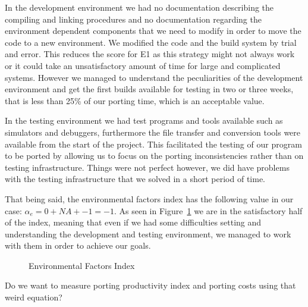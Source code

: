 In the development environment we had no documentation describing the compiling
and linking procedures and no documentation regarding the environment dependent
components that we need to modify in order to move the code to a new
environment. We modified the code and the build system by trial and error. This
reduces the score for E1 as this strategy might not always work or it could take
an unsatisfactory amount of time for large and complicated systems. However
we managed to understand the peculiarities of the development environment and
get the first builds available for testing in two or three weeks, that is less
than 25\% of our porting time, which is an acceptable value.

In the testing environment we had test programs and tools available such as
simulators and debuggers, furthermore the file transfer and conversion tools
were available from the start of the project. This facilitated the testing of
our program to be ported by allowing us to focus on the porting inconsistencies
rather than on testing infrastructure. Things were not perfect however, we did
have problems with the testing infrastructure that we solved in a short period
of time.

That being said, the environmental factors index has the following value in our
case: $\alpha_e = 0 + NA + -1 = -1$. As seen in Figure~\ref{fig:EFI} we are in the
satisfactory half of the index, meaning that even if we had some difficulties
setting and understanding the development and testing environment, we managed
to work with them in order to achieve our goals.

\begin{figure}

    \caption{Environmental Factors Index}
    \label{fig:EFI}
\end{figure}

Do we want to measure porting productivity index and porting costs using that
weird equation?
